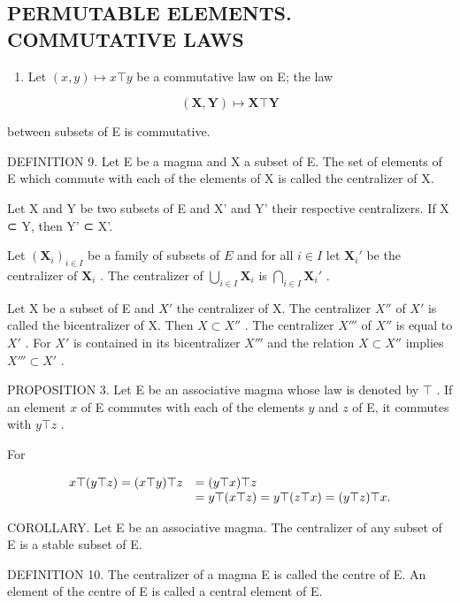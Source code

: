 \subsection{PERMUTABLE ELEMENTS. COMMUTATIVE LAWS}

\begin{enumerate}
\def\labelenumi{(\arabic{enumi})}
\setcounter{enumi}{3}
\tightlist
\item
  Let \((x, y) \mapsto x \top y\) be a commutative law on E; the law
\end{enumerate}

\[
(\mathbf {X}, \mathbf {Y}) \mapsto \mathbf {X} \top \mathbf {Y}
\]

between subsets of E is commutative.

DEFINITION 9. Let E be a magma and X a subset of E. The set of elements of E which commute with each of the elements of X is called the centralizer of X.

Let X and Y be two subsets of E and X' and Y' their respective centralizers. If X ⊂ Y, then Y' ⊂ X'.

Let \((\mathbf{X}_i)_{i\in I}\) be a family of subsets of \(E\) and for all \(i\in I\) let \(\mathbf{X}_i'\) be the centralizer of \(\mathbf{X}_i\) . The centralizer of \(\bigcup_{i\in I}\mathbf{X}_i\) is \(\bigcap_{i\in I}\mathbf{X}_i'\) .

Let X be a subset of E and \(X'\) the centralizer of X. The centralizer \(X''\) of \(X'\) is called the bicentralizer of X. Then \(X \subset X''\) . The centralizer \(X'''\) of \(X''\) is equal to \(X'\) . For \(X'\) is contained in its bicentralizer \(X'''\) and the relation \(X \subset X''\) implies \(X''' \subset X'\) .

PROPOSITION 3. Let E be an associative magma whose law is denoted by \(\top\) . If an element \(x\) of E commutes with each of the elements \(y\) and \(z\) of E, it commutes with \(y \top z\) .

For

\[
\begin{array}{r l} x \top (y \top z) = (x \top y) \top z & = (y \top x) \top z \\ & = y \top (x \top z) = y \top (z \top x) = (y \top z) \top x. \end{array}
\]

COROLLARY. Let E be an associative magma. The centralizer of any subset of E is a stable subset of E.

DEFINITION 10. The centralizer of a magma E is called the centre of E. An element of the centre of E is called a central element of E.

